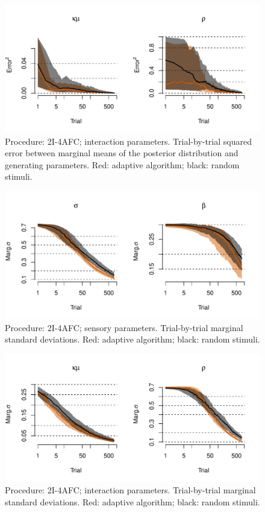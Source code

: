 \documentclass{article}\usepackage{knitr}
\begin{document}
\begin{figure}[H]
\centering
\includegraphics[scale=0.75, angle = 0]{simulation_AFC_interaction_sq_error}
\caption{Procedure: 2I-4AFC; interaction parameters. Trial-by-trial squared error between marginal means of the posterior distribution and generating parameters. Red: adaptive algorithm; black: random stimuli.}
\label{fig:simulation_AFC_interaction_sq_error}
\end{figure}

\begin{figure}[H]
\centering
\includegraphics[scale=0.75, angle = 0]{simulation_AFC_sensory_SD}
\caption{Procedure: 2I-4AFC; sensory parameters. Trial-by-trial marginal standard deviations. Red: adaptive algorithm; black: random stimuli.}
\label{fig:simulation_AFC_sensory_SD}
\end{figure}

\begin{figure}[H]
\centering
\includegraphics[scale=0.75, angle = 0]{simulation_AFC_interaction_SD}
\caption{Procedure: 2I-4AFC; interaction parameters. Trial-by-trial marginal standard deviations. Red: adaptive algorithm; black: random stimuli.}
\label{fig:simulation_AFC_interaction_SD}
\end{figure}
\end{document}
